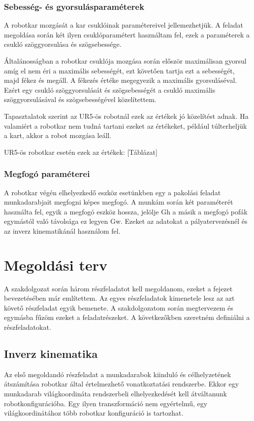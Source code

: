 \subsubsection{Sebesség- és gyorsulásparaméterek}

A robotkar mozgását a kar csuklóinak paramétereivel jellemezhetjük. A feladat megoldása során két ilyen csuklóparamétert használtam fel, ezek a paraméterek a csukló szöggyorsulása és szögsebessége.

Általánosságban a robotkar csuklója mozgása során először maximálisan gyorsul amíg el nem éri a maximális sebességét, ezt követően tartja ezt a sebességét, majd fékez és megáll. A fékezés értéke megegyezik a maximális gyorsuláséval.
Ezért egy csukló szöggyorsulását és szögsebességét a csukló maximális szöggyorsulásával és szögsebességével közelítettem.

Tapasztalatok szerint az  UR5-ös robotnál ezek az értékek jó közelítést adnak. Ha valamiért a robotkar nem tudná tartani ezeket az értékeket, például túlterheljük a kart, akkor a robot mozgása leáll. 

UR5-ös robotkar esetén ezek az értékek:
[Táblázat]

\subsubsection{Megfogó paraméterei}

A robotkar végén elhelyezkedő eszköz esetünkben egy a pakolási feladat munkadarabjait megfogni képes megfogó. A munkám során két paraméterét használta fel, egyik a megfogó eszköz hossza, jelölje Gh a másik a megfogó pofák egymástól való távolsága ez legyen Gw. Ezeket az adatokat a pályatervezésnél és az inverz kinematikánál használom fel.

\section{Megoldási terv}

A szakdolgozat során három részfeladatot kell megoldanom, ezeket a fejezet bevezetésében már említettem. Az egyes részfeladatok kimenetele lesz az azt követő részfeladat egyik bemenete. A szakdolgozatom során megtervezem és egymásba fűzöm ezeket a feladatrészeket. A következőkben szeretném definiálni a részfeladatokat. 

\subsection{Inverz kinematika}
Az első megoldandó részfeladat a munkadarabok kiinduló és célhelyzetének átszámítása robotkar által értelmezhető vonatkoztatási rendszerbe. Ekkor egy munkadarab világkoordináta rendszerbeli elhelyezkedését kell átváltanunk robotkonfigurációba. Egy ilyen transzformáció nem egyértelmű, egy világkoordinátához több robotkar konfiguráció is tartozhat.

